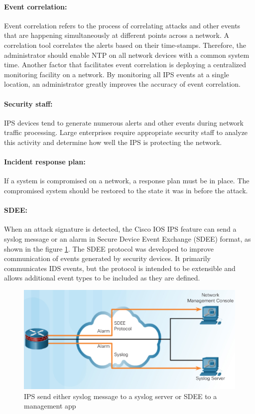 \paragraph{Event correlation:} Event correlation refers to the process of correlating attacks and other events that are happening simultaneously at different points across a network. A correlation tool correlates the alerts based on their time-stamps. Therefore, the administrator should enable NTP on all network devices with a common system time. Another factor that facilitates event correlation is deploying a centralized monitoring facility on a network. By monitoring all IPS events at a single location, an administrator greatly improves the accuracy of event correlation.

\paragraph{Security staff:} IPS devices tend to generate numerous alerts and other events during network traffic processing. Large enterprises require appropriate security staff to analyze this activity and determine how well the IPS is protecting the network. 

\paragraph{Incident response plan:} If a system is compromised on a network, a response plan must be in place. The compromised system should be restored to the state it was in before the attack. 

\paragraph{SDEE:} When an attack signature is detected, the Cisco IOS IPS feature can send a syslog message or an alarm in Secure Device Event Exchange (SDEE) format, as shown in the figure \ref{SDEE}. The SDEE protocol was developed to improve communication of events generated by security devices. It primarily communicates IDS events, but the protocol is intended to be extensible and allows additional event types to be included as they are defined.

\begin{figure}[hbtp]
\caption{IPS send either syslog message to a syslog server or SDEE to a management app}\label{SDEE}
\centering
\includegraphics[scale=0.7]{pictures/SDEE.PNG}
\end{figure}



